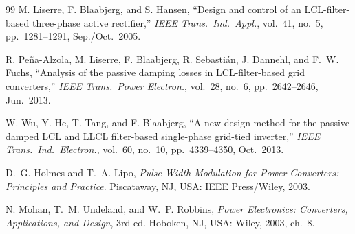 \documentclass[11pt,a4paper]{article}
\begin{document}
\begin{thebibliography}{99}
M. Liserre, F. Blaabjerg, and S. Hansen, ``Design and control of an LCL-filter-based
three-phase active rectifier,'' \emph{IEEE Trans.\ Ind.\ Appl.}, vol.~41, no.~5,
pp.~1281--1291, Sep./Oct.\ 2005.

R. Pe\~na-Alzola, M. Liserre, F. Blaabjerg, R. Sebasti\'an, J. Dannehl, and F.~W. Fuchs,
``Analysis of the passive damping losses in LCL-filter-based grid converters,''
\emph{IEEE Trans.\ Power Electron.}, vol.~28, no.~6, pp.~2642--2646, Jun.\ 2013.

W. Wu, Y. He, T. Tang, and F. Blaabjerg, ``A new design method for the passive damped
LCL and LLCL filter-based single-phase grid-tied inverter,'' \emph{IEEE Trans.\ Ind.\
Electron.}, vol.~60, no.~10, pp.~4339--4350, Oct.\ 2013.

D.~G. Holmes and T.~A. Lipo, \emph{Pulse Width Modulation for Power Converters:
Principles and Practice}. Piscataway, NJ, USA: IEEE Press/Wiley, 2003.

N. Mohan, T.~M. Undeland, and W.~P. Robbins, \emph{Power Electronics: Converters,
Applications, and Design}, 3rd ed. Hoboken, NJ, USA: Wiley, 2003, ch.~8.

\end{thebibliography}
\end{document}
